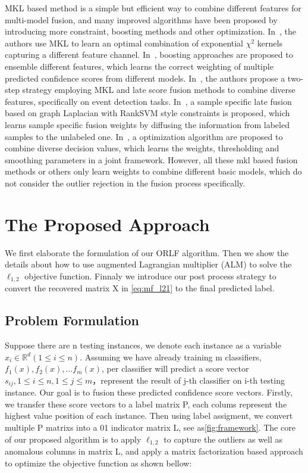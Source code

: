 \documentclass[letterpaper]{article}
\def\dsR{\mathds{R}}
\begin{document}
MKL based method is a simple but efficient way to combine different features for multi-model fusion,
and many improved algorithms have been proposed by introducing more constraint, boosting methods and other optimization.
In~\cite{vedaldi2009multiple}, the authors use MKL to learn an optimal combination of exponential ${\chi}^2$ kernels capturing a different feature channel. 
In~\cite{gehler2009feature}, boosting approaches are proposed to ensemble different features, which learns the correct weighting of multiple predicted confidence scores from different models.
In~\cite{natarajan2012multimodal}, the authors propose a two-step strategy employing MKL and late score fusion methods to combine diverse features, specifically on event detection tasks.
In~\cite{lai2015learning}, a sample specific late fusion based on graph Laplacian with RankSVM style constraints is proposed,
which learns sample specific fusion weights by diffusing the information from labeled samples to the unlabeled one.
In~\cite{xuiccv2013feature}, a optimization algorithm are proposed to combine diverse decision values, 
which learns the weights, thresholding and smoothing parameters in a joint framework.
However, all these mkl based fusion methods or others only learn weights to combine different basic models, which do not consider the outlier rejection in the fusion process specifically.


\section{The Proposed Approach}
We first elaborate the formulation of our ORLF algorithm. Then we show the details about how to use augmented Lagrangian multiplier (ALM) to solve the $\ell_{1,2}$ objective function. Finnaly we introduce our post process strategy to convert the recovered matrix X in \ref{eq:mf_l21} to the final predicted label.


\subsection{Problem Formulation}
Suppose there are n testing instances, we denote each instance as a variable $x_i{\in}\dsR^{d}(1{\leq}i{\leq}n)$. Assuming we have already training m classifiers, $f_1(x), f_2(x), ... f_m(x)$, per classifier will predict a score vector $s_{ij}, 1{\leq}i{\leq}n, 1{\leq}j{\leq}m $，represent the result of j-th classifier on i-th testing instance. Our goal is to fusion these predicted confidence score vectors. Firstly, we transfer these score vectors to a label matrix P, each colums represent the highest value position of each instance. Then using label assigment, we convert multiple P matrixs into a 01 indicator matrix L, see as{\ref{fig:framework}}.
The core of our proposed algorithm is to apply $\ell_{1,2}$ to capture the outliers as well as anomalous columns in matrix L, and apply a matrix factorization based approach to optimize the objective function as shown bellow: 
\end{document}
